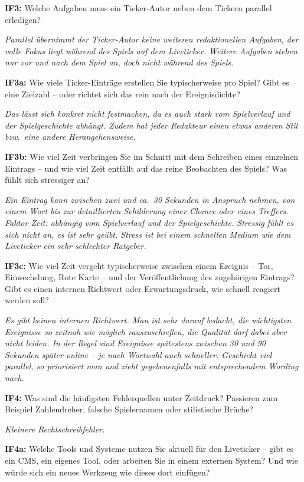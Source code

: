 \textbf{IF3:} Welche Aufgaben muss ein Ticker-Autor neben dem Tickern parallel erledigen?

\textit{Parallel übernimmt der Ticker-Autor keine weiteren redaktionellen Aufgaben, der volle Fokus liegt während des Spiels auf dem Liveticker. Weitere Aufgaben stehen nur vor und nach dem Spiel an, doch nicht während des Spiels.}

\textbf{IF3a:} Wie viele Ticker-Einträge erstellen Sie typischerweise pro Spiel? Gibt es eine Zielzahl -- oder richtet sich das rein nach der Ereignisdichte?

\textit{Das lässt sich konkret nicht festmachen, da es auch stark vom Spielverlauf und der Spielgeschichte abhängt. Zudem hat jeder Redakteur einen etwas anderen Stil bzw.\ eine andere Herangehensweise.}

\textbf{IF3b:} Wie viel Zeit verbringen Sie im Schnitt mit dem Schreiben eines einzelnen Eintrags -- und wie viel Zeit entfällt auf das reine Beobachten des Spiels? Was fühlt sich stressiger an?

\textit{Ein Eintrag kann zwischen zwei und ca.\ 30 Sekunden in Anspruch nehmen, von einem Wort bis zur detaillierten Schilderung einer Chance oder eines Treffers. Faktor Zeit: abhängig vom Spielverlauf und der Spielgeschichte. Stressig fühlt es sich nicht an, es ist sehr geübt. Stress ist bei einem schnellen Medium wie dem Liveticker ein sehr schlechter Ratgeber.}

\textbf{IF3c:} Wie viel Zeit vergeht typischerweise zwischen einem Ereignis -- Tor, Einwechslung, Rote Karte -- und der Veröffentlichung des zugehörigen Eintrags? Gibt es einen internen Richtwert oder Erwartungsdruck, wie schnell reagiert werden soll?

\textit{Es gibt keinen internen Richtwert. Man ist sehr darauf bedacht, die wichtigsten Ereignisse so zeitnah wie möglich rauszuschießen, die Qualität darf dabei aber nicht leiden. In der Regel sind Ereignisse spätestens zwischen 30 und 90 Sekunden später online -- je nach Wortwahl auch schneller. Geschieht viel parallel, so priorisiert man und zieht gegebenenfalls mit entsprechendem Wording nach.}

\textbf{IF4:} Was sind die häufigsten Fehlerquellen unter Zeitdruck? Passieren zum Beispiel Zahlendreher, falsche Spielernamen oder stilistische Brüche?

\textit{Kleinere Rechtschreibfehler.}

\textbf{IF4a:} Welche Tools und Systeme nutzen Sie aktuell für den Liveticker -- gibt es ein CMS, ein eigenes Tool, oder arbeiten Sie in einem externen System? Und wie würde sich ein neues Werkzeug wie dieses dort einfügen?

